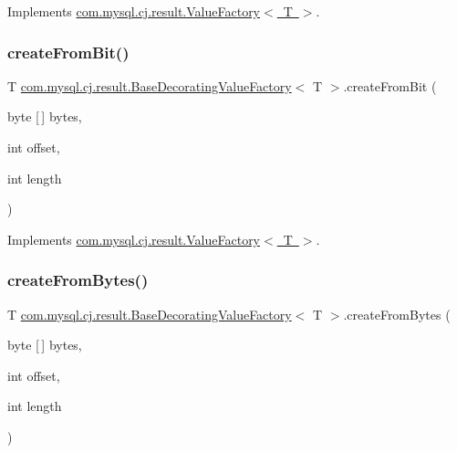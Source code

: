 Implements \mbox{\hyperlink{interfacecom_1_1mysql_1_1cj_1_1result_1_1_value_factory_a8b18f90981ce59ba61491c945b2820fe}{com.\+mysql.\+cj.\+result.\+Value\+Factory$<$ T $>$}}.

\mbox{\label{classcom_1_1mysql_1_1cj_1_1result_1_1_base_decorating_value_factory_ae424a4142df77302b0cc712d8d6b38be}} 
\subsubsection{\texorpdfstring{create\+From\+Bit()}{createFromBit()}}
{\footnotesize\ttfamily T \mbox{\hyperlink{classcom_1_1mysql_1_1cj_1_1result_1_1_base_decorating_value_factory}{com.\+mysql.\+cj.\+result.\+Base\+Decorating\+Value\+Factory}}$<$ T $>$.create\+From\+Bit (\begin{DoxyParamCaption}\item[{byte \mbox{[}$\,$\mbox{]}}]{bytes,  }\item[{int}]{offset,  }\item[{int}]{length }\end{DoxyParamCaption})}



Implements \mbox{\hyperlink{interfacecom_1_1mysql_1_1cj_1_1result_1_1_value_factory_a23ac617a66fbf713243dd67ab04d30e6}{com.\+mysql.\+cj.\+result.\+Value\+Factory$<$ T $>$}}.

\mbox{\label{classcom_1_1mysql_1_1cj_1_1result_1_1_base_decorating_value_factory_a36b451b3b030ef65417756206968626e}} 
\subsubsection{\texorpdfstring{create\+From\+Bytes()}{createFromBytes()}}
{\footnotesize\ttfamily T \mbox{\hyperlink{classcom_1_1mysql_1_1cj_1_1result_1_1_base_decorating_value_factory}{com.\+mysql.\+cj.\+result.\+Base\+Decorating\+Value\+Factory}}$<$ T $>$.create\+From\+Bytes (\begin{DoxyParamCaption}\item[{byte \mbox{[}$\,$\mbox{]}}]{bytes,  }\item[{int}]{offset,  }\item[{int}]{length }\end{DoxyParamCaption})}



